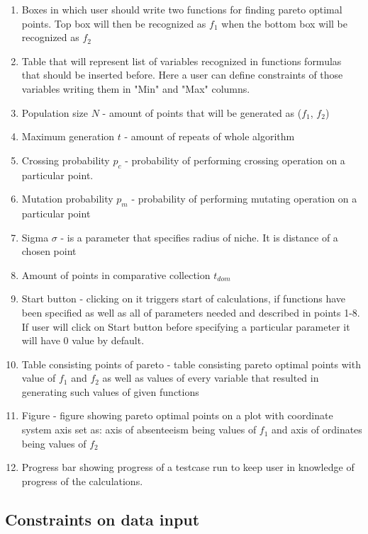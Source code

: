 \documentclass[a4paper, 11pt]{article}
\begin{document}
	\begin{enumerate}
		\item Boxes in which user should write two functions for finding pareto
			optimal points. Top box will then be recognized as $f_{1}$ when the 
			bottom box will be recognized as $f_{2}$
		\item Table that will represent list of variables recognized in functions
			formulas that should be inserted before. Here a user can define 
			constraints of those variables writing them in "Min" and "Max" columns.
		\item Population size $N$ - amount of points that will be generated as
			($f_{1}$, $f_{2}$)
		\item Maximum generation $t$ - amount of repeats of whole algorithm
		\item Crossing probability $p_{c}$ - probability of performing crossing
			operation on a particular point.
		\item Mutation probability $p_{m}$ - probability of performing mutating
			operation on a particular point
		\item Sigma $\sigma$ - is a parameter that specifies radius of niche. It is
			distance of a chosen point 
		\item Amount of points in comparative collection $t_{dom}$
		\item Start button - clicking on it triggers start of calculations, if
			functions have been specified as well as all of parameters needed and
			described in points 1-8. If user will click on Start button before
			specifying a particular parameter it will have $0$ value by default.
		\item Table consisting points of pareto - table consisting pareto optimal
			points with value of $f_{1}$ and $f_{2}$ as well as values of every
			variable that resulted in generating such values of given functions
		\item Figure - figure showing pareto optimal points on a plot with
			coordinate system axis set as: axis of absenteeism being values of
			$f_{1}$ and axis of ordinates being values of $f_{2}$
		\item Progress bar showing progress of a testcase run to keep user in
			knowledge of progress of the calculations.
	\end{enumerate}

	\subsection{Constraints on data input}
\end{document}
